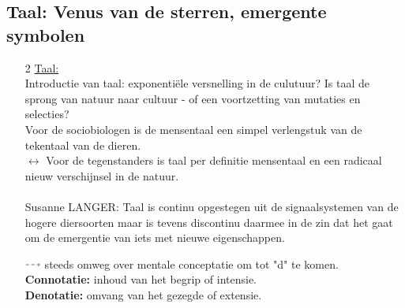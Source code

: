 \documentclass[11pt,a4paper]{article}
\newcommand*{\DashedArrow}[1][]{\mathbin{\tikz [baseline=-0.25ex,-latex, dashed,#1] \draw [#1] (0pt,0.5ex) -- (1.3em,0.5ex);}}%
\begin{document}
\subsection{Taal: Venus van de sterren, emergente symbolen}
\begin{enumerate}
\item[2] \underline{Taal:}
\\
Introductie van taal: exponenti\"ele versnelling in de culutuur? Is taal de sprong van natuur naar cultuur - of een voortzetting van mutaties en selecties?
\\
Voor de sociobiologen is de mensentaal een simpel verlengstuk van de tekentaal van de dieren.
\\
$\leftrightarrow$ Voor de tegenstanders is taal per definitie mensentaal en een radicaal nieuw verschijnsel in de natuur.
\\
\\
Susanne LANGER:
Taal is continu opgestegen uit de signaalsystemen van de hogere diersoorten maar is tevens discontinu daarmee in de zin dat het gaat om de emergentie van iets met nieuwe eigenschappen.

\begin{center}
\end{center}
$\DashedArrow[->,densely dashed    ]$ steeds omweg over mentale conceptatie om tot "d" te komen.
\\

\textbf{Connotatie:} inhoud van het begrip of intensie.
\\
\textbf{Denotatie:} omvang van het gezegde of extensie.
\\
\begin{center}
\end{center}
\end{enumerate}
\end{document}
